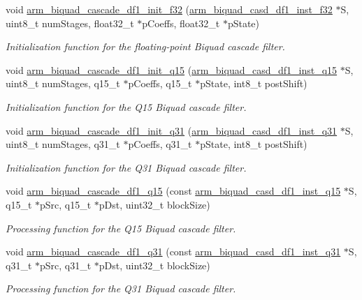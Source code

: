 \begin{DoxyCompactItemize}
void \hyperlink{group___biquad_cascade_d_f1_ga8e73b69a788e681a61bccc8959d823c5}{arm\-\_\-biquad\-\_\-cascade\-\_\-df1\-\_\-init\-\_\-f32} (\hyperlink{structarm__biquad__casd__df1__inst__f32}{arm\-\_\-biquad\-\_\-casd\-\_\-df1\-\_\-inst\-\_\-f32} $\ast$S, uint8\-\_\-t num\-Stages, float32\-\_\-t $\ast$p\-Coeffs, float32\-\_\-t $\ast$p\-State)
\begin{DoxyCompactList}\small\item\em Initialization function for the floating-\/point Biquad cascade filter. \end{DoxyCompactList}\item 
void \hyperlink{group___biquad_cascade_d_f1_gad54c724132f6d742a444eb6df0e9c731}{arm\-\_\-biquad\-\_\-cascade\-\_\-df1\-\_\-init\-\_\-q15} (\hyperlink{structarm__biquad__casd__df1__inst__q15}{arm\-\_\-biquad\-\_\-casd\-\_\-df1\-\_\-inst\-\_\-q15} $\ast$S, uint8\-\_\-t num\-Stages, q15\-\_\-t $\ast$p\-Coeffs, q15\-\_\-t $\ast$p\-State, int8\-\_\-t post\-Shift)
\begin{DoxyCompactList}\small\item\em Initialization function for the Q15 Biquad cascade filter. \end{DoxyCompactList}\item 
void \hyperlink{group___biquad_cascade_d_f1_gaf42a44f9b16d61e636418c83eefe577b}{arm\-\_\-biquad\-\_\-cascade\-\_\-df1\-\_\-init\-\_\-q31} (\hyperlink{structarm__biquad__casd__df1__inst__q31}{arm\-\_\-biquad\-\_\-casd\-\_\-df1\-\_\-inst\-\_\-q31} $\ast$S, uint8\-\_\-t num\-Stages, q31\-\_\-t $\ast$p\-Coeffs, q31\-\_\-t $\ast$p\-State, int8\-\_\-t post\-Shift)
\begin{DoxyCompactList}\small\item\em Initialization function for the Q31 Biquad cascade filter. \end{DoxyCompactList}\item 
void \hyperlink{group___biquad_cascade_d_f1_gadd66a0aefdc645031d607b0a5b37a942}{arm\-\_\-biquad\-\_\-cascade\-\_\-df1\-\_\-q15} (const \hyperlink{structarm__biquad__casd__df1__inst__q15}{arm\-\_\-biquad\-\_\-casd\-\_\-df1\-\_\-inst\-\_\-q15} $\ast$S, q15\-\_\-t $\ast$p\-Src, q15\-\_\-t $\ast$p\-Dst, uint32\-\_\-t block\-Size)
\begin{DoxyCompactList}\small\item\em Processing function for the Q15 Biquad cascade filter. \end{DoxyCompactList}\item 
void \hyperlink{group___biquad_cascade_d_f1_ga27b0c54da702713976e5202d20b4473f}{arm\-\_\-biquad\-\_\-cascade\-\_\-df1\-\_\-q31} (const \hyperlink{structarm__biquad__casd__df1__inst__q31}{arm\-\_\-biquad\-\_\-casd\-\_\-df1\-\_\-inst\-\_\-q31} $\ast$S, q31\-\_\-t $\ast$p\-Src, q31\-\_\-t $\ast$p\-Dst, uint32\-\_\-t block\-Size)
\begin{DoxyCompactList}\small\item\em Processing function for the Q31 Biquad cascade filter. \end{DoxyCompactList}\end{DoxyCompactItemize}


